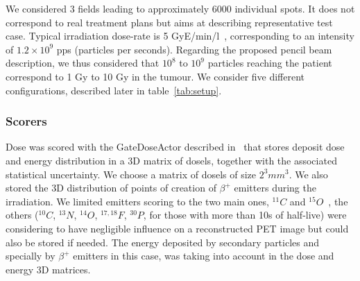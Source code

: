 \documentclass[11pt]{iopart}
\begin{document}
We considered 3 fields leading to approximately 6000 individual
spots. It does not correspond to real treatment plans but aims at
describing representative test case. Typical irradiation dose-rate is
5 GyE/min/l~\cite{Noda2007}, corresponding to an intensity of
$1.2\times 10^9$ pps (particles per seconds). Regarding the proposed
pencil beam description, we thus considered that $10^8$ to $10^9$
particles reaching the patient correspond to 1 Gy to 10 Gy in the
tumour. We consider five different configurations, described later in
table~\ref{tab:setup}.






\subsubsection{Scorers}

Dose was scored with the GateDoseActor described
in~\cite{Jan2011,Sarrut2008} that stores deposit dose and energy
distribution in a 3D matrix of dosels, together with the associated
statistical uncertainty. We choose a matrix of dosels of size $2^3
mm^3$.  We also stored the 3D distribution of points of creation of
$\beta^+$ emitters during the irradiation. We limited emitters scoring
to the two main ones, $^{11}C$ and $^{15}O$~\cite{Pshenichnov2007},
the others ($^{10}C$, $^{13}N$, $^{14}O$, $^{17,18}F$, $^{30}P$, for
those with more than 10s of half-live) were considering to have
negligible influence on a reconstructed PET image but could also be
stored if needed. The energy deposited by secondary particles and
specially by $\beta^+$ emitters in this case, was taking into account
in the dose and energy 3D matrices.
\end{document}
